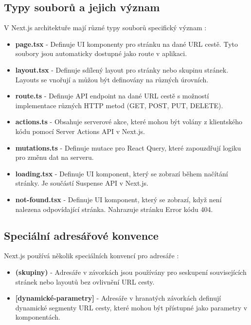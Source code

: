 \documentclass[12pt]{article}
\begin{document}
\subsection{Typy souborů a jejich význam}

V Next.js architektuře mají různé typy souborů specifický význam \citep{Vercel2023FileConventions}:

\begin{itemize}
  \item \textbf{page.tsx} - Definuje UI komponenty pro stránku na dané URL cestě. Tyto soubory jsou automaticky dostupné jako route v aplikaci.
  
  \item \textbf{layout.tsx} - Definuje sdílený layout pro stránky nebo skupinu stránek. Layouts se vnořují a můžou být definovány na různých úrovních.
  
  \item \textbf{route.ts} - Definuje API endpoint na dané URL cestě s možností implementace různých HTTP metod (GET, POST, PUT, DELETE).
  
  \item \textbf{actions.ts} - Obsahuje serverové akce, které mohou být volány z klientského kódu pomocí Server Actions API v Next.js.
  
  \item \textbf{mutations.ts} - Definuje mutace pro React Query, které zapouzdřují logiku pro změnu dat na serveru.
  
  \item \textbf{loading.tsx} - Definuje UI komponent, který se zobrazí během načítání stránky. Je součástí Suspense API v Next.js.
  
  \item \textbf{not-found.tsx} - Definuje UI komponent, který se zobrazí, když není nalezena odpovídající stránka. Nahrazuje stránku Error kódu 404.
\end{itemize}

\subsection{Speciální adresářové konvence}

Next.js používá několik speciálních konvencí pro adresáře \citep{Vercel2023RouteGroups}:

\begin{itemize}
  \item \textbf{(skupiny)} - Adresáře v závorkách jsou používány pro seskupení souvisejících stránek nebo layoutů bez ovlivnění URL cesty.
  
  \item \textbf{[dynamické-parametry]} - Adresáře v hranatých závorkách definují dynamické segmenty URL cesty, které mohou být přístupné jako parametry v komponentách.
\end{itemize}
\end{document}
